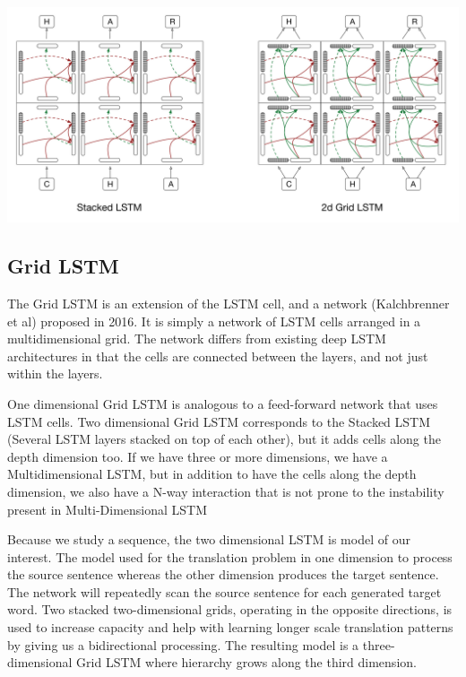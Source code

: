 \documentclass{article} %
\begin{document}
\newline
\includegraphics[scale=0.4]{stacked_vs_2dgrid} \newline

\subsection{Grid LSTM}
The Grid LSTM is an extension of the LSTM cell, and a network (Kalchbrenner et al) \cite{Kalchbrenner} proposed in 2016. It is simply a network of LSTM cells arranged in a multidimensional grid. The network differs from existing deep LSTM architectures in that the cells are connected between the layers, and not just within the layers. 

One dimensional Grid LSTM is analogous to a feed-forward network that uses LSTM cells. Two dimensional Grid LSTM corresponds to the Stacked LSTM (Several LSTM layers stacked on top of each other), but it adds cells along the depth dimension too. If we have three or more dimensions, we have a Multidimensional LSTM, but in addition to have the cells along the depth dimension, we also have a N-way interaction that is not prone to the instability present in Multi-Dimensional LSTM

Because we study a sequence, the two dimensional LSTM is model of our interest. The model used for the translation problem in  \cite{Kalchbrenner} one dimension to process the source sentence whereas the other dimension produces the target sentence. The network will repeatedly scan the source sentence for each generated target word. Two stacked two-dimensional grids, operating in the opposite directions, is used to increase capacity and help with learning longer scale translation patterns by giving us a bidirectional processing. The resulting model is a three-dimensional Grid LSTM where hierarchy grows along the third dimension. 
\end{document}
